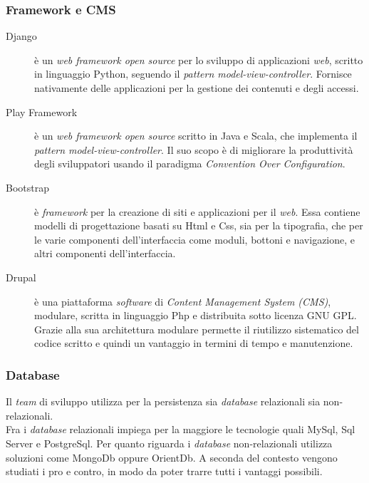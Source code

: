 \subsubsection{Framework e CMS}
\begin{description}
\item[Django] è un \emph{web framework open source} per lo sviluppo di applicazioni \emph{web}, scritto in linguaggio Python, seguendo il \emph{pattern model-view-controller}. Fornisce nativamente delle applicazioni per la gestione dei contenuti e degli accessi.
\item[Play Framework] è un \emph{web framework open source} scritto in Java e Scala, che implementa il \emph{pattern model-view-controller}. Il suo scopo è di migliorare la produttività degli sviluppatori usando il paradigma \emph{Convention Over Configuration}.\newpage
\item[Bootstrap] è \emph{framework} per la creazione di siti e applicazioni per il \emph{web}. Essa contiene modelli di progettazione basati su Html e Css, sia per la tipografia, che per le varie componenti dell'interfaccia come moduli, bottoni e navigazione, e altri componenti dell'interfaccia.
\item[Drupal] è una piattaforma \emph{software} di \emph{Content Management System (CMS)}, modulare, scritta in linguaggio Php e distribuita sotto licenza GNU GPL. Grazie alla sua architettura modulare permette il riutilizzo sistematico del codice scritto e quindi un vantaggio in termini di tempo e manutenzione.
\end{description}

\subsubsection{Database}
Il \emph{team} di sviluppo utilizza per la persistenza sia \emph{database} relazionali sia non-relazionali.\\Fra i \emph{database} relazionali impiega per la maggiore le tecnologie quali MySql, Sql Server e PostgreSql. Per quanto riguarda i \emph{database} non-relazionali utilizza soluzioni come MongoDb oppure OrientDb. A seconda del contesto vengono studiati i pro e contro, in modo da poter trarre tutti i vantaggi possibili.




\newpage
